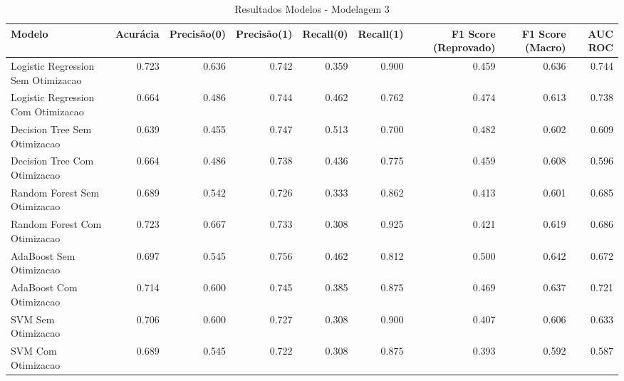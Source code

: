 \begin{table}[H] %
    \centering
    \caption{Resultados Modelos - Modelagem 3}
    \label{tab:resultados_modelagem_3}
    \renewcommand{\arraystretch}{1.25} %
    \begin{adjustwidth}{ -1in }{ -1in } %
    \centering %
    \small %
    \begin{tabular}{lrrrrrrrr}
\toprule
                            Modelo &  Acurácia &  Precisão(0) &  Precisão(1) &  Recall(0) &  Recall(1) &  F1 Score (Reprovado) &  F1 Score (Macro) &  AUC ROC \\
\midrule
Logistic Regression Sem Otimizacao &     0.723 &        0.636 &        0.742 &      0.359 &      0.900 &                 0.459 &             0.636 &    0.744 \\
Logistic Regression Com Otimizacao &     0.664 &        0.486 &        0.744 &      0.462 &      0.762 &                 0.474 &             0.613 &    0.738 \\
      Decision Tree Sem Otimizacao &     0.639 &        0.455 &        0.747 &      0.513 &      0.700 &                 0.482 &             0.602 &    0.609 \\
      Decision Tree Com Otimizacao &     0.664 &        0.486 &        0.738 &      0.436 &      0.775 &                 0.459 &             0.608 &    0.596 \\
      Random Forest Sem Otimizacao &     0.689 &        0.542 &        0.726 &      0.333 &      0.862 &                 0.413 &             0.601 &    0.685 \\
      Random Forest Com Otimizacao &     0.723 &        0.667 &        0.733 &      0.308 &      0.925 &                 0.421 &             0.619 &    0.686 \\
           AdaBoost Sem Otimizacao &     0.697 &        0.545 &        0.756 &      0.462 &      0.812 &                 0.500 &             0.642 &    0.672 \\
           AdaBoost Com Otimizacao &     0.714 &        0.600 &        0.745 &      0.385 &      0.875 &                 0.469 &             0.637 &    0.721 \\
                SVM Sem Otimizacao &     0.706 &        0.600 &        0.727 &      0.308 &      0.900 &                 0.407 &             0.606 &    0.633 \\
                SVM Com Otimizacao &     0.689 &        0.545 &        0.722 &      0.308 &      0.875 &                 0.393 &             0.592 &    0.587 \\
\bottomrule
\end{tabular}
    \end{adjustwidth}
    \renewcommand{\arraystretch}{1.0} %
\end{table}
